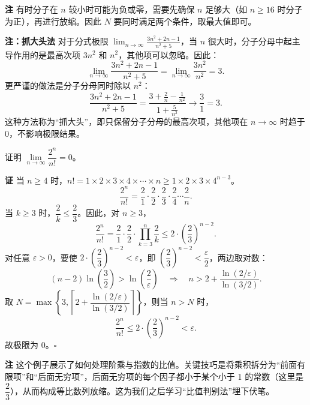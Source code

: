 \documentclass{ctexart}
\newenvironment{custom}[1]{\par\noindent \textbf{#1}\quad}{\par\vspace{1em}}
\begin{document}
\begin{custom}{注}
有时分子在 \(n\) 较小时可能为负或零，需要先确保 \(n\) 足够大（如 \(n \geq 16\) 时分子为正），再进行放缩。因此 \(N\) 要同时满足两个条件，取最大值即可。
\end{custom}

\begin{custom}{注：抓大头法}
对于分式极限 \(\lim_{n\to\infty} \frac{3n^2 + 2n - 1}{n^2 + 5}\)，当 \(n\) 很大时，分子分母中起主导作用的是最高次项 \(3n^2\) 和 \(n^2\)，其他项可以忽略。因此：
\[
\lim_{n\to\infty} \frac{3n^2 + 2n - 1}{n^2 + 5} = \lim_{n\to\infty} \frac{3n^2}{n^2} = 3.
\]
更严谨的做法是分子分母同时除以 \(n^2\)：
\[
\frac{3n^2 + 2n - 1}{n^2 + 5} = \frac{3 + \frac{2}{n} - \frac{1}{n^2}}{1 + \frac{5}{n^2}} \to \frac{3}{1} = 3.
\]
这种方法称为“抓大头”，即只保留分子分母的最高次项，其他项在 \(n\to\infty\) 时趋于 0，不影响极限结果。
\end{custom}

\begin{example}
证明 \(\lim\limits_{n\to\infty} \dfrac{2^n}{n!} = 0\)。
\end{example}
\begin{custom}{证}
当 \(n \geq 4\) 时，\(n! = 1 \times 2 \times 3 \times 4 \times \cdots \times n \geq 1 \times 2 \times 3 \times 4^{n-3}\)。
\[
\dfrac{2^n}{n!} = \dfrac{2}{1} \cdot \dfrac{2}{2} \cdot \dfrac{2}{3} \cdot \dfrac{2}{4} \cdots \dfrac{2}{n}.
\]
当 \(k \geq 3\) 时，\(\dfrac{2}{k} \leq \dfrac{2}{3}\)。因此，对 \(n \geq 3\)，
\[
\dfrac{2^n}{n!} = \dfrac{2}{1} \cdot \dfrac{2}{2} \cdot \prod_{k=3}^{n} \dfrac{2}{k} \leq 2 \cdot \left(\dfrac{2}{3}\right)^{n-2}.
\]
对任意 \(\varepsilon > 0\)，要使 \(2 \cdot \left(\dfrac{2}{3}\right)^{n-2} < \varepsilon\)，即 \(\left(\dfrac{2}{3}\right)^{n-2} < \dfrac{\varepsilon}{2}\)，两边取对数：
\[
(n-2) \ln\left(\dfrac{3}{2}\right) > \ln\left(\dfrac{2}{\varepsilon}\right) \quad\Longrightarrow\quad n > 2 + \dfrac{\ln(2/\varepsilon)}{\ln(3/2)}.
\]
取 \(N = \max\left\{3, \left\lceil 2 + \dfrac{\ln(2/\varepsilon)}{\ln(3/2)} \right\rceil\right\}\)，则当 \(n > N\) 时，
\[
\dfrac{2^n}{n!} \leq 2 \cdot \left(\dfrac{2}{3}\right)^{n-2} < \varepsilon.
\]
故极限为 0。\(\square\)
\end{custom}

\begin{custom}{注}
这个例子展示了如何处理阶乘与指数的比值。关键技巧是将乘积拆分为“前面有限项”和“后面无穷项”，后面无穷项的每个因子都小于某个小于 1 的常数（这里是 \(\dfrac{2}{3}\)），从而构成等比数列放缩。这为我们之后学习“比值判别法”埋下伏笔。
\end{custom}
\end{document}
